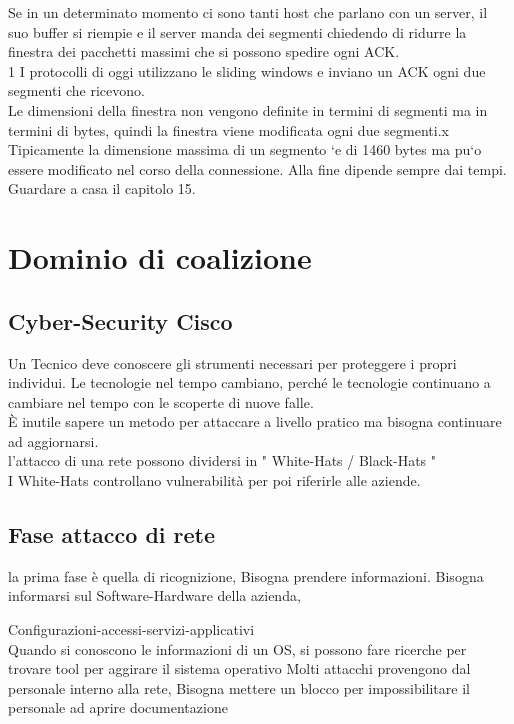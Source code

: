 \documentclass{article}
\begin{document}
Se in un determinato momento ci sono tanti host che parlano con un server,
il suo buffer si riempie e il server manda dei segmenti chiedendo di ridurre la
finestra dei pacchetti massimi che si possono spedire ogni ACK.\\
1
I protocolli di oggi utilizzano le sliding windows e inviano un ACK ogni due
segmenti che ricevono.\\
Le dimensioni della finestra non vengono definite in termini di segmenti ma
in termini di bytes, quindi la finestra viene modificata ogni due segmenti.x
Tipicamente la dimensione massima di un segmento `e di 1460 bytes ma pu`o
essere modificato nel corso della connessione.
Alla fine dipende sempre dai tempi.
Guardare a casa il capitolo 15.\\

\section{Dominio di coalizione}

\subsection{Cyber-Security Cisco}

Un Tecnico deve conoscere gli strumenti necessari per proteggere i propri individui.
Le tecnologie nel tempo cambiano, perché le tecnologie continuano a cambiare nel tempo con le scoperte di nuove falle.
\\È inutile sapere un metodo per attaccare a livello pratico ma bisogna continuare ad aggiornarsi.
\\l'attacco di una rete possono dividersi in " White-Hats / Black-Hats " 
\\I White-Hats controllano vulnerabilità per poi riferirle alle aziende.

\subsection{Fase attacco di rete}

la prima fase è quella di ricognizione, Bisogna prendere informazioni. 
Bisogna informarsi sul Software-Hardware della azienda, 

Configurazioni-accessi-servizi-applicativi
\\Quando si conoscono le informazioni di un OS, si possono fare ricerche per trovare tool per aggirare il sistema operativo
Molti attacchi provengono dal personale interno alla rete, Bisogna mettere un blocco per impossibilitare il personale ad aprire documentazione
\end{document}
